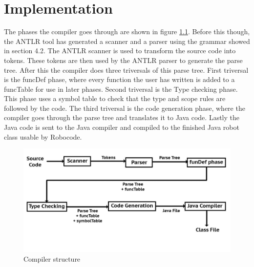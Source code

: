 \chapter{Implementation}
The phases the compiler goes through are shown in figure \ref{cs}. Before this though, the ANTLR tool has generated a scanner and a parser using the grammar showed in section 4.2. The ANTLR scanner is used to transform the source code into tokens. These tokens are then used by the ANTLR parser to generate the parse tree. After this the compiler does three triversals of this parse tree. First triversal is the funcDef phase, where every function the user has written is added to a funcTable for use in later phases. Second triversal is the Type checking phase. This phase uses a symbol table to check that the type and scope rules are followed by the code. The third triversal is the code generation phase, where the compiler goes through the parse tree and translates it to Java code. Lastly the Java code is sent to the Java compiler and compiled to the finished Java robot class usable by Robocode.

\begin{figure}[h]
\centering
\includegraphics[scale=0.35]{billeder/compilerStructure}
\caption{Compiler structure}
\label{cs}
\end{figure}

